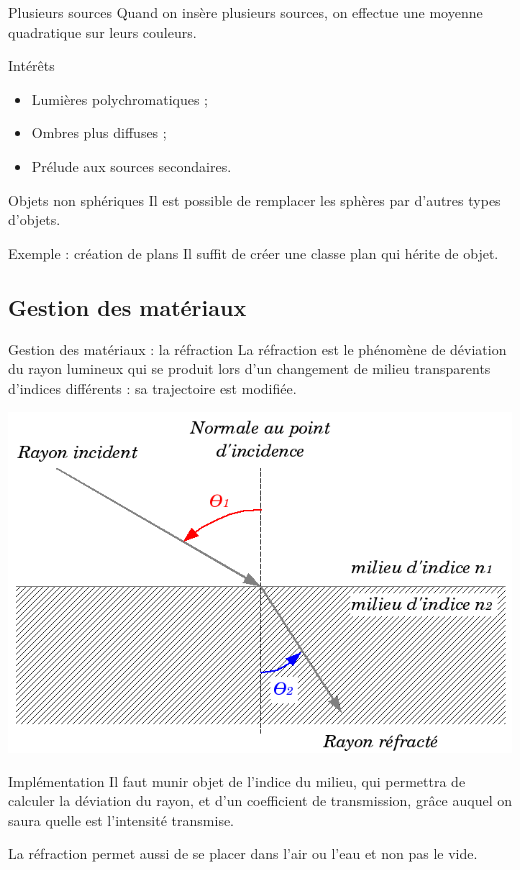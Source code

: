 \documentclass{beamer}
\begin{document}
\begin{frame}{Plusieurs sources}
  Quand on insère plusieurs sources, on effectue une moyenne quadratique sur
leurs couleurs.
  \begin{block}{Intérêts}
    \begin{itemize}
    \item Lumières polychromatiques ;
    \item Ombres plus diffuses ;
    \item Prélude aux sources secondaires.
    \end{itemize}
  \end{block}
\end{frame}

\begin{frame}{Objets non sphériques}
Il est possible de remplacer les sphères par d'autres types d'objets.

\begin{block}{Exemple : création de plans}
Il suffit de créer une classe plan qui hérite de objet.
\end{block}
\end{frame}

\subsection{Gestion des matériaux}
\begin{frame}{Gestion des matériaux : la réfraction}
La réfraction est le phénomène de déviation du rayon lumineux qui se produit
lors d'un changement de milieu transparents d'indices différents : sa
trajectoire est modifiée.

\begin{center}
  \includegraphics[scale=0.2]{img/Refraction_fr.png}
\end{center}

\begin{block}{Implémentation}
Il faut munir objet de l'indice du milieu, qui permettra de calculer la
déviation du rayon, et d'un coefficient de transmission, grâce auquel on saura
quelle est l'intensité transmise.
\end{block}

La réfraction permet aussi de se placer dans l'air ou l'eau et non pas le vide.
\end{frame}
\end{document}
